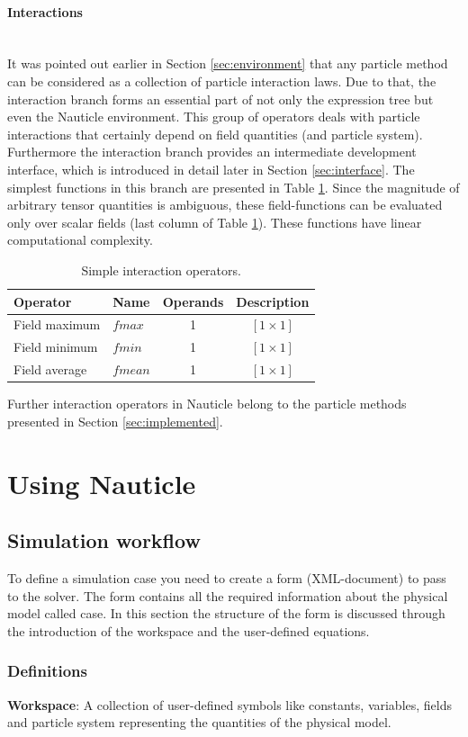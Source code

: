 \documentclass[a4paper,12pt,openany]{book}
\newcommand{\myparagraph}[1]{\paragraph{#1}\mbox{}\\}
\theoremstyle{break}
\begin{document}
\myparagraph{Interactions}
It was pointed out earlier in Section \ref{sec:environment} that any particle method can be considered as a collection of particle interaction laws. Due to that, the interaction branch forms an essential part of not only the expression tree but even the Nauticle environment. This group of operators deals with particle interactions that certainly depend on field quantities (and particle system). Furthermore the interaction branch provides an intermediate development interface, which is introduced in detail later in Section \ref{sec:interface}.
The simplest functions in this branch are presented in Table \ref{tbl:fsearch}. Since the magnitude of arbitrary tensor quantities is ambiguous, these field-functions can be evaluated only over scalar fields (last column of Table \ref{tbl:fsearch}). These functions have linear computational complexity.
\begin{table}
\begin{center}
\caption{Simple interaction operators.}\label{tbl:fsearch}
\begin{tabular}{ l l c c }
\toprule[1.5pt]
\bf Operator & \bf Name & \bf Operands & \bf Description\\
\midrule
Field maximum & $fmax$ & 1 & $[1 \times 1]$\\ 
Field minimum & $fmin$ & 1 & $[1 \times 1]$\\ 
Field average & $fmean$ & 1 & $[1 \times 1]$\\
\bottomrule[1.25pt]
\end{tabular}
\end{center}
\end{table}
Further interaction operators in Nauticle belong to the particle methods presented in Section \ref{sec:implemented}.

\section{Using Nauticle}
\subsection{Simulation workflow} \label{sec:sim_workflow}
To define a simulation case you need to create a form (XML-document) to pass to the solver. The form contains all the required information about the physical model called case. In this section the structure of the form is discussed through the introduction of the workspace and the user-defined equations.
\subsubsection{Definitions}
\textbf{Workspace}: A collection of user-defined symbols like constants, variables, fields and particle system representing the quantities of the physical model.
\end{document}

